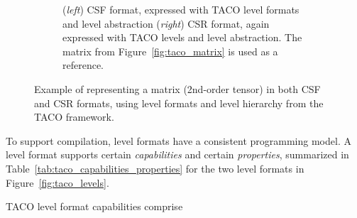 \begin{figure}[H]
\begin{subfigure}[b]{0.4\textwidth}
        \caption{(\textit{left}) CSF\cite{csf} format, expressed with TACO\cite{taco} level formats and level abstraction\cite{taco_format} (\textit{right}) CSR format, again expressed with TACO levels and level abstraction. The matrix from Figure~\ref{fig:taco_matrix} is used as a reference.}
        \label{fig:taco_csf_csr}
    \end{subfigure}
    \caption{Example of representing a matrix (2nd-order tensor) in both CSF\cite{csf} and CSR formats, using level formats\cite{taco_format} and level hierarchy from the TACO\cite{taco} framework.}
    \label{fig:taco_format_example}
\end{figure}

To support compilation, level formats have a consistent programming model\cite{taco_format}. A level format supports certain \textit{capabilities} and certain \textit{properties}\cite{taco_format}, summarized in Table~\ref{tab:taco_capabilities_properties} for the two level formats in Figure~\ref{fig:taco_levels}.

\begin{table}[h]
\centering
\caption{An excerpt from Table 1 of the TACO sparse format paper\cite{taco_format} showing the abstract interface to each TACO level format. V: supports coordinate value iteration.  P: supports position iteration. I: supports insert. A: supports append. (\checkmark) indicates that the particular property is contingent on the fiber configuration, whereas a normal checkmark indicates full support.}
\label{tab:taco_capabilities_properties}
\end{table}

TACO level format capabilities comprise

